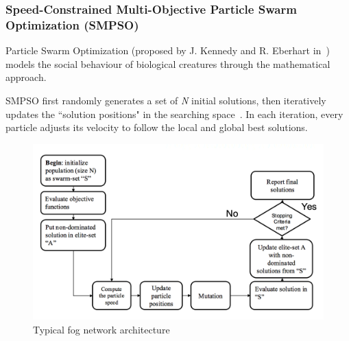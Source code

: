 \documentclass[10pt,journal,compsoc]{IEEEtran}
\begin{document}
\subsubsection{Speed-Constrained Multi-Objective Particle Swarm Optimization (SMPSO)}
Particle Swarm Optimization (proposed by J. Kennedy and R. Eberhart in~\cite{poli2017}) models the social behaviour of biological creatures through the mathematical approach.

SMPSO first randomly generates a set of \textit{N} initial solutions, then iteratively updates the ``solution positions" in the searching space~\cite{smpso}.
In each iteration, every particle adjusts its velocity to follow the local and global best solutions. 

\begin{figure}[ht]
\centerline{\includegraphics[width=\columnwidth]{psophaseflowchart.png}}
\caption{Typical fog network architecture} 
\label{foggg}
\end{figure}
\end{document}
